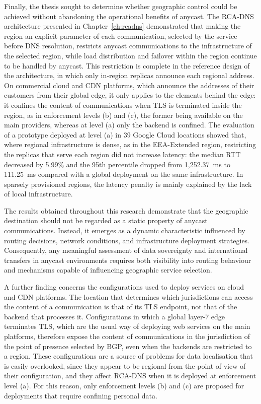 Finally, the thesis sought to determine whether geographic control could be achieved without abandoning the operational benefits of anycast. The RCA-DNS architecture presented in Chapter~\ref{ch:rcadns} demonstrated that making the region an explicit parameter of each communication, selected by the service before DNS resolution, restricts anycast communications to the infrastructure of the selected region, while load distribution and failover within the region continue to be handled by anycast. This restriction is complete in the reference design of the architecture, in which only in-region replicas announce each regional address. On commercial cloud and CDN platforms, which announce the addresses of their customers from their global edge, it only applies to the elements behind the edge: it confines the content of communications when TLS is terminated inside the region, as in enforcement levels (b) and (c), the former being available on the main providers, whereas at level (a) only the backend is confined. The evaluation of a prototype deployed at level (a) in 39 Google Cloud locations showed that, where regional infrastructure is dense, as in the EEA-Extended region, restricting the replicas that serve each region did not increase latency: the median RTT decreased by 5.99\% and the 95th percentile dropped from 1{,}252.37~ms to 111.25~ms compared with a global deployment on the same infrastructure. In sparsely provisioned regions, the latency penalty is mainly explained by the lack of local infrastructure.

The results obtained throughout this research demonstrate that the geographic destination should not be regarded as a static property of anycast communications. Instead, it emerges as a dynamic characteristic influenced by routing decisions, network conditions, and infrastructure deployment strategies. Consequently, any meaningful assessment of data sovereignty and international transfers in anycast environments requires both visibility into routing behaviour and mechanisms capable of influencing geographic service selection.

A further finding concerns the configurations used to deploy services on cloud and CDN platforms. The location that determines which jurisdictions can access the content of a communication is that of its TLS endpoint, not that of the backend that processes it. Configurations in which a global layer-7 edge terminates TLS, which are the usual way of deploying web services on the main platforms, therefore expose the content of communications in the jurisdiction of the point of presence selected by BGP, even when the backends are restricted to a region. These configurations are a source of problems for data localisation that is easily overlooked, since they appear to be regional from the point of view of their configuration, and they affect RCA-DNS when it is deployed at enforcement level (a). For this reason, only enforcement levels (b) and (c) are proposed for deployments that require confining personal data.

